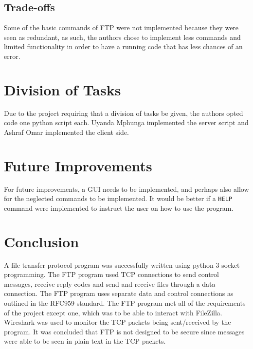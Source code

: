 \documentclass[journal, a4paper]{IEEEtran}
\begin{document}
\subsection{Trade-offs}
Some of the basic commands of FTP were not implemented because they were seen as redundant, as such, the authors chose to implement less commands and limited functionality in order to have a running code that has less chances of an error.

\section{Division of Tasks}

Due to the project requiring that a division of tasks be given, the authors opted code one python script each. Uyanda Mphunga implemented the server script and Ashraf Omar implemented the client side.

\section{Future Improvements}

For future improvements, a GUI needs to be implemented, and perhaps also allow for the neglected commands to be implemented. It would be better if a \texttt{HELP} command were implemented to instruct the user on how to use the program.

\section{Conclusion}
A file transfer protocol program was successfully written using python 3 socket programming. The FTP program used TCP connections to send control messages, receive reply codes and send and receive files through a data connection. The FTP program uses separate data and control connections as outlined in the RFC959 standard. The FTP program met all of the requirements of the project except one, which was to be able to interact with FileZilla. Wireshark was used to monitor the TCP packets being sent/received by the program. It was concluded that FTP is not designed to be secure since messages were able to be seen in plain text in the TCP packets.
%
\onecolumn


\newpage
\appendix
\end{document}
